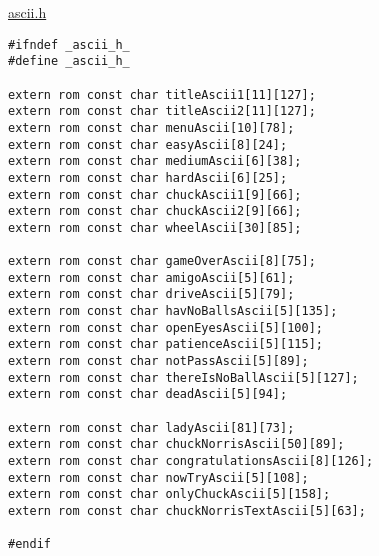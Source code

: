 \underline{ascii.h}
\begin{lstlisting}
#ifndef _ascii_h_
#define _ascii_h_

extern rom const char titleAscii1[11][127];
extern rom const char titleAscii2[11][127];
extern rom const char menuAscii[10][78];
extern rom const char easyAscii[8][24];
extern rom const char mediumAscii[6][38];
extern rom const char hardAscii[6][25];
extern rom const char chuckAscii1[9][66];
extern rom const char chuckAscii2[9][66];
extern rom const char wheelAscii[30][85];

extern rom const char gameOverAscii[8][75];
extern rom const char amigoAscii[5][61];
extern rom const char driveAscii[5][79];
extern rom const char havNoBallsAscii[5][135];
extern rom const char openEyesAscii[5][100];
extern rom const char patienceAscii[5][115];
extern rom const char notPassAscii[5][89];
extern rom const char thereIsNoBallAscii[5][127];
extern rom const char deadAscii[5][94];

extern rom const char ladyAscii[81][73];
extern rom const char chuckNorrisAscii[50][89];
extern rom const char congratulationsAscii[8][126];
extern rom const char nowTryAscii[5][108];
extern rom const char onlyChuckAscii[5][158];
extern rom const char chuckNorrisTextAscii[5][63];

#endif
\end{lstlisting}


